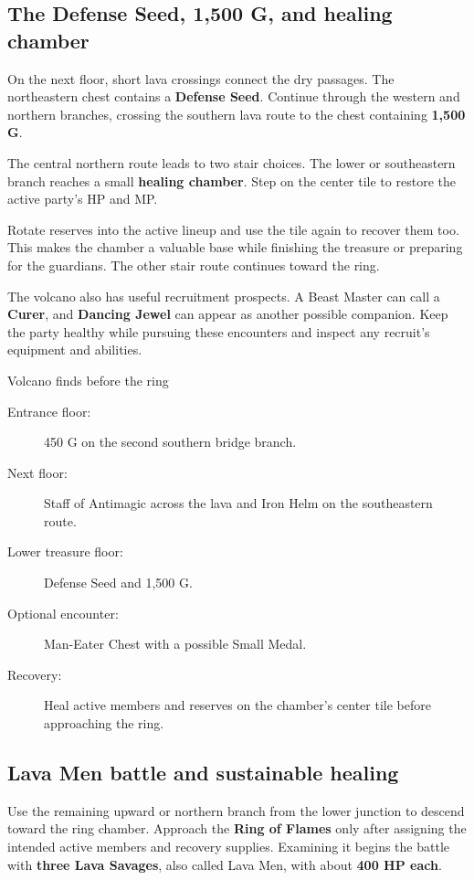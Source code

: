 \subsection*{The Defense Seed, 1,500 G, and healing chamber}

On the next floor, short lava crossings connect the dry passages.
The northeastern chest contains a \textbf{Defense Seed}. Continue
through the western and northern branches, crossing the southern
lava route to the chest containing \textbf{1,500 G}.

The central northern route leads to two stair choices. The lower or
southeastern branch reaches a small \textbf{healing chamber}. Step
on the center tile to restore the active party's HP and MP.

Rotate reserves into the active lineup and use the tile again to
recover them too. This makes the chamber a valuable base while
finishing the treasure or preparing for the guardians. The other
stair route continues toward the ring.

The volcano also has useful recruitment prospects. A Beast Master
can call a \textbf{Curer}, and \textbf{Dancing Jewel} can appear
as another possible companion. Keep the party healthy while pursuing
these encounters and inspect any recruit's equipment and abilities.

\begin{routecheck}{Volcano finds before the ring}
\begin{description}
  \item[Entrance floor:] 450 G on the second southern bridge branch.
  \item[Next floor:] Staff of Antimagic across the lava and Iron Helm
    on the southeastern route.
  \item[Lower treasure floor:] Defense Seed and 1,500 G.
  \item[Optional encounter:] Man-Eater Chest with a possible Small Medal.
  \item[Recovery:] Heal active members and reserves on the chamber's
    center tile before approaching the ring.
\end{description}
\end{routecheck}

\subsection{Lava Men battle and sustainable healing}

Use the remaining upward or northern branch from the lower junction
to descend toward the ring chamber. Approach the \textbf{Ring of Flames}
only after assigning the intended active members and recovery supplies.
Examining it begins the battle with \textbf{three Lava Savages}, also
called Lava Men, with about \textbf{400 HP each}.


